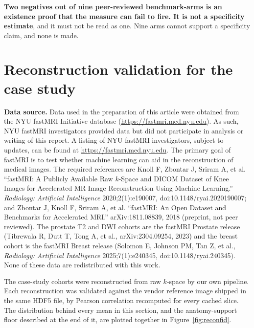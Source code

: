 \documentclass[11pt,a4paper]{article}
\begin{document}
\textbf{Two negatives out of nine peer-reviewed benchmark-arms is an existence proof
that the measure can fail to fire. It is not a specificity estimate}, and it must not
be read as one. Nine arms cannot support a specificity claim, and none is made.

\clearpage
\section{Reconstruction validation for the case study}

\textbf{Data source.} Data used in the preparation of this article were obtained from
the NYU fastMRI Initiative database (\url{https://fastmri.med.nyu.edu}). As such, NYU
fastMRI investigators provided data but did not participate in analysis or writing of
this report. A listing of NYU fastMRI investigators, subject to updates, can be found
at \url{https://fastmri.med.nyu.edu}. The primary goal of fastMRI is to test whether
machine learning can aid in the reconstruction of medical images. The required
references are Knoll F, Zbontar J, Sriram A, et al. ``fastMRI: A Publicly Available
Raw $k$-Space and DICOM Dataset of Knee Images for Accelerated MR Image Reconstruction
Using Machine Learning.'' \emph{Radiology: Artificial Intelligence} 2020;2(1):e190007,
doi:10.1148/ryai.2020190007; and Zbontar J, Knoll F, Sriram A, et al. ``fastMRI: An
Open Dataset and Benchmarks for Accelerated MRI.'' arXiv:1811.08839, 2018 (preprint,
not peer reviewed). The prostate T2 and DWI cohorts are the fastMRI Prostate release
(Tibrewala R, Dutt T, Tong A, et al., arXiv:2304.09254, 2023) and the breast cohort is
the fastMRI Breast release (Solomon E, Johnson PM, Tan Z, et al., \emph{Radiology:
Artificial Intelligence} 2025;7(1):e240345, doi:10.1148/ryai.240345). None of these
data are redistributed with this work.

The case-study cohorts were reconstructed from raw $k$-space by our own pipeline. Each
reconstruction was validated against the vendor reference image shipped in the same
HDF5 file, by Pearson correlation recomputed for every cached slice. The distribution
behind every mean in this section, and the anatomy-support floor described at the end
of it, are plotted together in Figure~\ref{fig:reconfid}.
\end{document}
